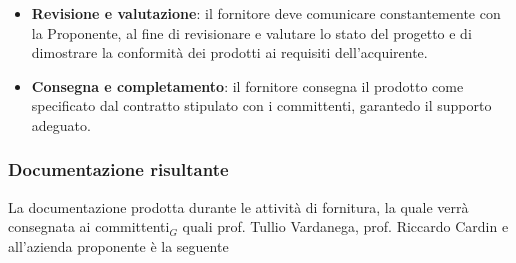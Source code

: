 \documentclass[10pt, letterpaper]{article}
\begin{document}
\begin{itemize}
    \item \textbf{Revisione e valutazione}: il fornitore deve comunicare constantemente con la Proponente, al fine di revisionare e valutare lo stato del progetto e di dimostrare la conformità dei prodotti ai requisiti dell'acquirente.
    
    \item \textbf{Consegna e completamento}: il fornitore consegna il prodotto come specificato dal contratto stipulato con i committenti, garantedo il supporto adeguato.
\end{itemize}

\subsubsection{Documentazione risultante}
La documentazione prodotta durante le attività di fornitura, la quale verrà consegnata ai committenti$_{G}$ quali prof. Tullio Vardanega, prof. Riccardo Cardin e all'azienda proponente è la seguente
\end{document}
